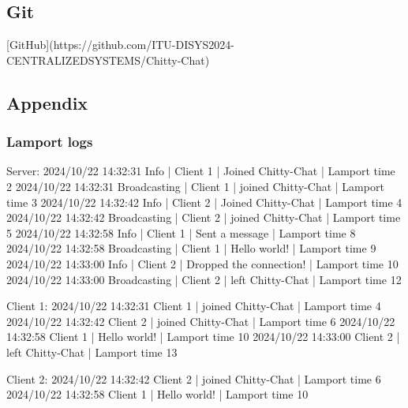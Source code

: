 \documentclass[a4paper,11pt]{article}
\begin{document}
\subsection*{Git}
[GitHub](https://github.com/ITU-DISYS2024-CENTRALIZEDSYSTEMS/Chitty-Chat)

\subsection*{Appendix}

\subsubsection*{Lamport logs}
Server:
2024/10/22 14:32:31 Info | Client 1 | Joined Chitty-Chat | Lamport time 2
2024/10/22 14:32:31 Broadcasting | Client 1 | joined Chitty-Chat | Lamport time 3
2024/10/22 14:32:42 Info | Client 2 | Joined Chitty-Chat | Lamport time 4
2024/10/22 14:32:42 Broadcasting | Client 2 | joined Chitty-Chat | Lamport time 5
2024/10/22 14:32:58 Info | Client 1 | Sent a message | Lamport time 8
2024/10/22 14:32:58 Broadcasting | Client 1 | Hello world! | Lamport time 9
2024/10/22 14:33:00 Info | Client 2 | Dropped the connection! | Lamport time 10
2024/10/22 14:33:00 Broadcasting | Client 2 | left Chitty-Chat | Lamport time 12

Client 1:
2024/10/22 14:32:31 Client 1 | joined Chitty-Chat | Lamport time 4
2024/10/22 14:32:42 Client 2 | joined Chitty-Chat | Lamport time 6
2024/10/22 14:32:58 Client 1 | Hello world! | Lamport time 10
2024/10/22 14:33:00 Client 2 | left Chitty-Chat | Lamport time 13

Client 2:
2024/10/22 14:32:42 Client 2 | joined Chitty-Chat | Lamport time 6
2024/10/22 14:32:58 Client 1 | Hello world! | Lamport time 10
\end{document}
